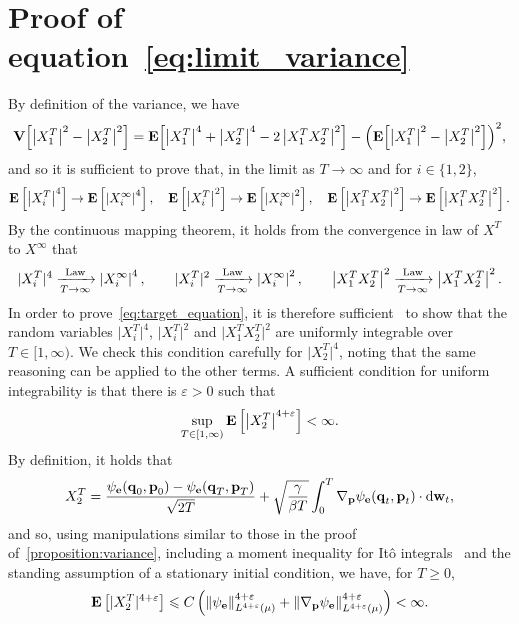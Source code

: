 \documentclass[11pt,a4paper]{article}
\begin{document}
\section{Proof of \texorpdfstring{equation~\eqref{eq:limit_variance}}{the limit of the variance}}%
\label{sec:proof_of_equation_variance}
By definition of the variance,
we have
\[
    \mathbf{V} \Bigl[ \left\lvert X^T_1 \right\rvert^2 - \left\lvert X^T_2 \right\rvert^2 \Bigr]
    = \mathbf{E} \Bigl[ \left\lvert X^T_1 \right\rvert^4 + \left\lvert X^T_2 \right\rvert^4 - 2 \left\lvert X^T_1 X^T_2 \right\rvert^2 \Bigr]
    - \Bigl( \mathbf{E} \Bigl[ \left\lvert X^T_1 \right\rvert^2 - \left\lvert X^T_2 \right\rvert^2 \Bigr] \Bigr)^2,
\]
and so it is sufficient to prove that,
in the limit as $T \to \infty$ and for $i \in \{1, 2\}$,
\begin{align}
    \label{eq:target_equation}
    \mathbf{E} \left[ \left\lvert X^T_i \right\rvert^4 \right]
    \to \mathbf{E} \left[ \left\lvert X^{\infty}_i \right\rvert^4 \right],
    \quad
    \mathbf{E} \left[ \left\lvert X^T_i \right\rvert^2 \right]
    \to \mathbf{E} \left[ \left\lvert X^{\infty}_i \right\rvert^2 \right],
    \quad
    \mathbf{E} \left[ \left\lvert X^T_1 X^T_2 \right\rvert^2 \right]
    \to \mathbf{E} \left[ \left\lvert X^T_1 X^T_2 \right\rvert^2 \right].
\end{align}
By the continuous mapping theorem,
it holds from the convergence in law of $X^{T}$ to $X^{\infty}$ that
\[
     \lvert X^T_i \rvert^4
    \xrightarrow[T \to \infty]{\rm Law}
    \left\lvert X^{\infty}_i \right\rvert^4 ,
    \qquad
     \lvert X^T_i \rvert^2
    \xrightarrow[T \to \infty]{\rm Law}
    \left\lvert X^{\infty}_i \right\rvert^2 ,
    \qquad
     \left\lvert X^T_1 X^T_2 \right\rvert^2
    \xrightarrow[T \to \infty]{\rm Law}
    \left\lvert X^T_1 X^T_2 \right\rvert^2 .
\]
In order to prove~\eqref{eq:target_equation},
it is therefore sufficient~\cite[Theorem 3.5]{MR1700749}
to show that the random variables $\lvert X^T_i \rvert^4$, $\lvert X^T_i \rvert^2$ and $\lvert X^T_1 X^T_2 \rvert^2$
are uniformly integrable over $T \in [1, \infty)$.
We check this condition carefully for $\lvert X^T_2 \rvert^4$,
noting that the same reasoning can be applied to the other terms.
A sufficient condition for uniform integrability is that there is $\varepsilon > 0$ such that
\[
    \sup_{T \in [1, \infty)} \mathbf{E} \left[ \left\lvert X^T_2 \right\rvert^{4+\varepsilon} \right] < \infty.
\]
By definition,
it holds that
\[
    X^T_2 =
    \frac{\psi_{\boldsymbol{\mathbf e}}(\boldsymbol{\mathbf q}_0, \boldsymbol{\mathbf p}_0) - \psi_{\boldsymbol{\mathbf e}}(\boldsymbol{\mathbf q}_T, \boldsymbol{\mathbf p}_T)}{\sqrt{2T}}
    + \sqrt{\frac{\gamma}{\beta T}} \int_{0}^{T} \nabla_{\boldsymbol{\mathbf p}} \psi_{\boldsymbol{\mathbf e}} (\boldsymbol{\mathbf q}_t, \boldsymbol{\mathbf p}_t) \cdot \mathrm d \boldsymbol{\mathbf w}_t,
\]
and so, using manipulations similar to those in the proof of~\cref{proposition:variance},
including a moment inequality for It\^o integrals~\cite[Theorem 7.1]{MR2380366} and the standing assumption of a stationary initial condition,
we have, for $T \geq 0$,
\[
    \expect \left[ \lvert X^T_2 \rvert^{4+ \varepsilon} \right]
    \leq
    C \left( \norm{\psi_{\vect e}}[L^{4+\varepsilon}(\mu)]^{4 + \varepsilon} +
        \norm{\grad_{\vect p} \psi_{\vect e}}[L^{4+\varepsilon}(\mu)]^{4+\varepsilon}
        \right) < \infty.
\]
\end{document}

